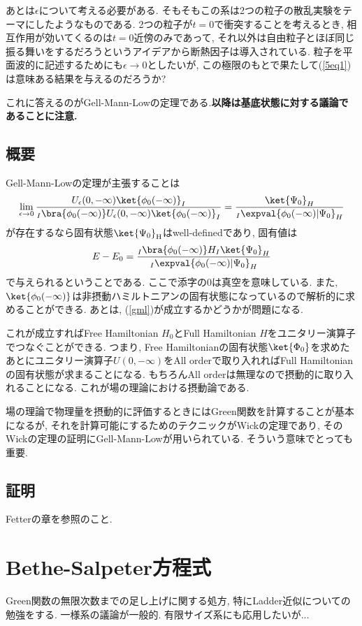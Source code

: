 \documentclass[10.5pt,a4paper]{jreport}
\begin{document}
あとは$\epsilon$について考える必要がある. そもそもこの系は2つの粒子の散乱実験をテーマにしたようなものである. 2つの粒子が$t = 0$で衝突することを考えるとき, 相互作用が効いてくるのは$t = 0$近傍のみであって, それ以外は自由粒子とほぼ同じ振る舞いをするだろうというアイデアから断熱因子は導入されている. 粒子を平面波的に記述するためにも$\epsilon\rightarrow 0$としたいが, この極限のもとで果たして(\ref{5eq1})は意味ある結果を与えるのだろうか?

これに答えるのがGell-Mann-Lowの定理である.\textbf{以降は基底状態に対する議論であることに注意.}
\subsection{概要}
Gell-Mann-Lowの定理が主張することは
\begin{eqnarray}
  \lim_{\epsilon\rightarrow0}\frac{U_\epsilon(0, -\infty)\ket{\phi_0(-\infty)}_I}{_I\bra{\phi_0(-\infty)}U_\epsilon(0, -\infty)\ket{\phi_0(-\infty)}_I} = \frac{\ket{\Psi_0}_H}{_I\expval{\phi_0(-\infty)|\Psi_0}_H}\label{gml}
\end{eqnarray}
が存在するなら固有状態$\ket{\Psi_0}_{\rm H}$はwell-definedであり, 固有値は
\begin{eqnarray}
  E-E_0 = \frac{_I\bra{\phi_0(-\infty)}H_I\ket{\Psi_0}_H}{_I\expval{\phi_0(-\infty)|\Psi_0}_H}
\end{eqnarray}
で与えられるということである. ここで添字の0は真空を意味している. また, $\ket{\phi_0(-\infty)}$は非摂動ハミルトニアンの固有状態になっているので解析的に求めることができる. あとは, (\ref{gml})が成立するかどうかが問題になる.

これが成立すればFree Hamiltonian $H_0$とFull Hamiltonian $H$をユニタリー演算子でつなぐことができる. つまり, Free Hamiltonianの固有状態$\ket{\Phi_0}$を求めたあとにユニタリー演算子$U(0, -\infty)$をAll orderで取り入れればFull Hamiltonianの固有状態が求まることになる. もちろんAll orderは無理なので摂動的に取り入れることになる. これが場の理論における摂動論である.

場の理論で物理量を摂動的に評価するときにはGreen関数を計算することが基本になるが, それを計算可能にするためのテクニックがWickの定理であり, そのWickの定理の証明にGell-Mann-Lowが用いられている. そういう意味でとっても重要. 
\subsection{証明}
Fetterの章を参照のこと.
\section{Bethe-Salpeter方程式}
Green関数の無限次数までの足し上げに関する処方, 特にLadder近似についての勉強をする. 一様系の議論が一般的. 有限サイズ系にも応用したいが...
\end{document}
